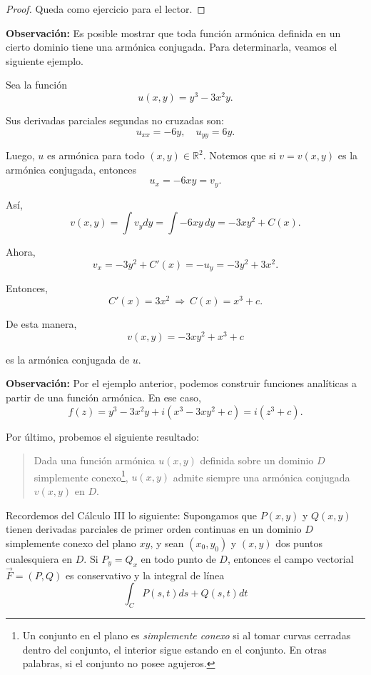 \begin{proof}
Queda como ejercicio para el lector.
\end{proof}

\textbf{Observación:} Es posible mostrar que toda función armónica definida en un cierto dominio tiene una armónica conjugada. Para determinarla, veamos el siguiente ejemplo.

\begin{ejemplo}
Sea  la función
$$u(x,y) = y^3-3x^2y.$$

Sus derivadas parciales segundas no cruzadas son:
$$u_{xx} = -6y, \quad u_{yy} = 6y. $$

Luego, $u$ es armónica para todo $(x,y) \in \mathbb{R}^2$. Notemos que si $v = v(x,y)$ es la armónica conjugada, entonces
$$u_x = -6xy = v_y.$$

Así,
$$v(x,y) = \int v_y dy = \int -6xy \,dy = -3xy^2 + C(x).$$

Ahora,
$$v_x = -3y^2 + C'(x) = -u_y = -3y^2 + 3x^2.$$

Entonces,
$$C'(x) = 3x^2 ~\Rightarrow~ C(x) = x^3 + c.$$

De esta manera,
$$v(x,y) = -3xy^2 + x^3 + c$$

es la armónica conjugada de $u$.
\end{ejemplo}

\textbf{Observación:} Por el ejemplo anterior, podemos construir funciones analíticas a partir de una función armónica. En ese caso,
$$f(z) = y^3 - 3x^2y + i(x^3 -3xy^2 + c) = i(z^3+c).$$

Por último, probemos el siguiente resultado:

\begin{quote}
    Dada una función armónica $u(x,y)$ definida sobre un dominio $D$ simplemente conexo\footnote{Un conjunto en el plano es \textit{simplemente conexo} si al tomar curvas cerradas dentro del conjunto, el interior sigue estando en el conjunto. En otras palabras, si el conjunto no posee agujeros.}, $u(x,y)$ admite siempre una armónica conjugada $v(x,y)$ en $D$.
\end{quote}

Recordemos del Cálculo III lo siguiente: Supongamos que $P(x,y)$ y $Q(x,y)$ tienen derivadas parciales de primer orden continuas en un dominio $D$ simplemente conexo del plano $xy$, y sean $(x_0,y_0)$ y $(x,y)$ dos puntos cualesquiera en $D$. Si $P_y = Q_x$ en todo punto de $D$, entonces el campo vectorial $\Vec{F} = (P,Q)$ es conservativo y la integral de línea
$$\int_C P(s,t) ds + Q(s,t) dt$$

